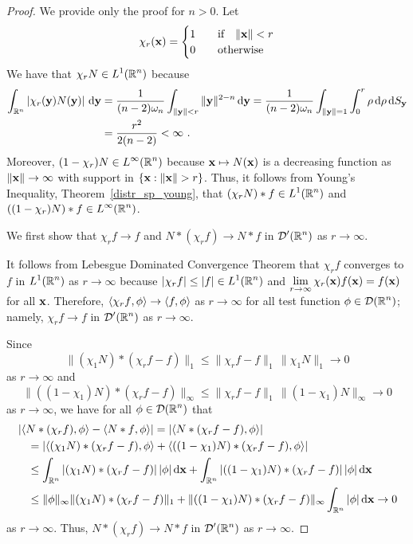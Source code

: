 \begin{proof}
We provide only the proof for $n>0$.  Let
\[
\chi_r(\mathbf{x}) = \begin{cases}
1 & \quad \text{if} \quad \|\mathbf{x}\| < r \\
0 & \quad \text{otherwise}
\end{cases}
\]
We have that $\displaystyle \chi_r N \in L^1(\mathbb{R}^n)$ because
\begin{align*}
\int_{\mathbb{R}^n} \left| \chi_r(\mathbf{y}) N(\mathbf{y}) \right| \,\mathrm{d}{\mathbf{y}}
&= \frac{1}{(n-2)\omega_n} \int_{\|\mathbf{y}\|<r} \|\mathbf{y}\|^{2-n} \,\mathrm{d}{\mathbf{y}}
= \frac{1}{(n-2)\omega_n}
\int_{\|\mathbf{y}\|=1} \int_0^r \rho \,\mathrm{d}{\rho} \,\mathrm{d}{S_{\mathbf{y}}} \\
&= \frac{r^2}{2(n-2)} < \infty \ .
\end{align*}
Moreover, $\displaystyle (1-\chi_r)N \in L^{\infty}(\mathbb{R}^n)$ because
$\mathbf{x} \mapsto N(\mathbf{x})$ is a decreasing function as
$\|\mathbf{x}\|\to \infty$ with support in $\{\mathbf{x} : \|\mathbf{x} \| > r\}$.
Thus, it follows from Young's Inequality, Theorem~\ref{distr_sp_young},
that $\displaystyle ( \chi_r N ) \ast f \in L^1(\mathbb{R}^n)$ and
$\displaystyle ( (1-\chi_r)N ) \ast f \in L^{\infty}(\mathbb{R}^n)$.

We first show that $\chi_r f \to f$ and $N \ast (\chi_r f) \to N \ast f$ in
$\displaystyle \mathcal{D}'(\mathbb{R}^n)$ as $r \to \infty$.

It follows from Lebesgue Dominated Convergence Theorem that
$\chi_r f$ converges to $f$ in $\displaystyle L^1(\mathbb{R}^n)$ as $r \to \infty$
because $\displaystyle |\chi_r f| \leq |f| \in L^1(\mathbb{R}^n)$ and
$\displaystyle \lim_{r\to \infty}\chi_r(\mathbf{x})f(\mathbf{x}) = f(\mathbf{x})$
for all $\mathbf{x}$.
Therefore, $\left\langle{\chi_r f} , {\phi}\right\rangle \to \left\langle{f} , {\phi}\right\rangle$ as $r\to \infty$
for all test function $\displaystyle \phi \in \mathcal{D}(\mathbb{R}^n)$; namely,
$\chi_r f \to f$ in $\displaystyle \mathcal{D}'(\mathbb{R}^n)$ as $r\to \infty$. 

Since
\[
\| (\chi_1 N) \ast (\chi_r f - f) \|_1 \leq \|\chi_r f - f\|_1
\, \|\chi_1 N\|_1 \to 0
\]
as $r \to \infty$ and
\[
\| ((1-\chi_1) N) \ast (\chi_r f - f) \|_{\infty} \leq \|\chi_r f - f\|_1
\, \|(1-\chi_1) N\|_\infty \to 0
\]
as $r \to \infty$, we have for all $\displaystyle \phi \in \mathcal{D}(\mathbb{R}^n)$ that
\begin{align*}
&\left| \left\langle{N\ast (\chi_r f)} , {\phi}\right\rangle - \left\langle{N\ast f} , {\phi}\right\rangle\right|
= \left| \left\langle{N\ast (\chi_r f -f)} , {\phi}\right\rangle\right| \\
&\quad = \left| \left\langle{(\chi_1 N) \ast (\chi_r f -f)} , {\phi}\right\rangle
+\left\langle{((1-\chi_1) N) \ast (\chi_r f -f)} , {\phi}\right\rangle\right| \\
&\quad \leq \int_{\mathbb{R}^n} |(\chi_1 N) \ast (\chi_r f -f) |\,
  |\phi|\,\mathrm{d}{\mathbf{x}}
+ \int_{\mathbb{R}^n} |((1-\chi_1)N) \ast (\chi_r f -f) |\, |\phi| \,\mathrm{d}{\mathbf{x}} \\
&\quad \leq \|\phi\|_{\infty} \|(\chi_1 N)\ast (\chi_r f -f) \|_1
+ \|((1-\chi_1)N) \ast (\chi_r f -f)\|_{\infty}\int_{\mathbb{R}^n} |\phi| \,\mathrm{d}{\mathbf{x}}
\to 0
\end{align*}
as $r \to \infty$.  Thus, $N \ast (\chi_r f) \to N \ast f$
in $\displaystyle \mathcal{D}'(\mathbb{R}^n)$ as $r \to \infty$.


\end{proof}
